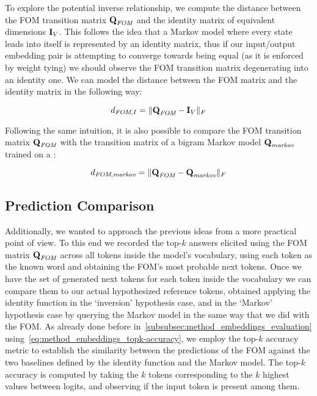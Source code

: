 To explore the potential inverse relationship, we compute the distance between the FOM transition matrix $\bm{\mathbf{Q}}_{\textit{FOM}}$ and the identity matrix of equivalent dimensions $\bm{\mathbf{I}}_V$.
This follows the idea that a Markov model where every state leads into itself is represented by an identity matrix, thus if our input/output embedding pair is attempting to converge towards being equal (as it is enforced by weight tying) we should observe the FOM transition matrix degenerating into an identity one.
We can model the distance between the FOM matrix and the identity matrix in the following way:

\begin{equation}
    \label{eq:method_fom_fom-i-comp}
    d_{\textit{FOM},I} = \| \bm{\mathbf{Q}}_{\textit{FOM}} - \bm{\mathbf{I}}_V \|_F
\end{equation}

Following the same intuition, it is also possible to compare the FOM transition matrix $\bm{\mathbf{Q}}_{\textit{FOM}}$ with the transition matrix of a bigram Markov model $\bm{\mathbf{Q}}_{\textit{markov}}$ trained on a :

\begin{equation}
    \label{eq:method_fom_fom-markov-comp}
    d_{\textit{FOM},\textit{markov}} = \| \bm{\mathbf{Q}}_{\textit{FOM}} - \bm{\mathbf{Q}}_{\textit{markov}} \|_F
\end{equation}

\subsection{Prediction Comparison}\label{ssec:method_fom_pred}

Additionally, we wanted to approach the previous ideas from a more practical point of view.
To this end we recorded the top-$k$ answers elicited using the FOM matrix $\bm{\mathbf{Q}}_{\textit{FOM}}$ across all tokens inside the model's vocabulary, using each token as the known word and obtaining the FOM's most probable next tokens.
Once we have the set of generated next tokens for each token inside the vocabulary we can compare them to our actual hypothesized reference tokens, obtained applying the identity function in the `inversion' hypothesis case, and in the `Markov' hypothesis case by querying the Markov model in the same way that we did with the FOM.
As already done before in~\cref{subsubsec:method_embeddings_evaluation} using~\cref{eq:method_embeddings_topk-accuracy}, we employ the top-$k$ accuracy metric to establish the similarity between the predictions of the FOM against the two baselines defined by the identity function and the Markov model.
The top-$k$ accuracy is computed by taking the $k$ tokens corresponding to the $k$ highest values between logits, and observing if the input token is present among them.

